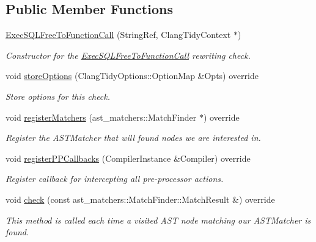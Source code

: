 \subsection*{Public Member Functions}
\begin{DoxyCompactItemize}
\item 
\hyperlink{classclang_1_1tidy_1_1pagesjaunes_1_1_exec_s_q_l_free_to_function_call_a389597efb3707e3478b53bdfdbb35a97}{Exec\+S\+Q\+L\+Free\+To\+Function\+Call} (String\+Ref, Clang\+Tidy\+Context $\ast$)
\begin{DoxyCompactList}\small\item\em Constructor for the \hyperlink{classclang_1_1tidy_1_1pagesjaunes_1_1_exec_s_q_l_free_to_function_call}{Exec\+S\+Q\+L\+Free\+To\+Function\+Call} rewriting check. \end{DoxyCompactList}\item 
void \hyperlink{classclang_1_1tidy_1_1pagesjaunes_1_1_exec_s_q_l_free_to_function_call_af83c40cd6384a2f9f2f9be2111addb93}{store\+Options} (Clang\+Tidy\+Options\+::\+Option\+Map \&Opts) override
\begin{DoxyCompactList}\small\item\em Store options for this check. \end{DoxyCompactList}\item 
void \hyperlink{classclang_1_1tidy_1_1pagesjaunes_1_1_exec_s_q_l_free_to_function_call_ac1311e6f8192bcea3c146493ff0130f3}{register\+Matchers} (ast\+\_\+matchers\+::\+Match\+Finder $\ast$) override
\begin{DoxyCompactList}\small\item\em Register the A\+S\+T\+Matcher that will found nodes we are interested in. \end{DoxyCompactList}\item 
void \hyperlink{classclang_1_1tidy_1_1pagesjaunes_1_1_exec_s_q_l_free_to_function_call_ac02e35d73287fc5b930c6122b2fcb1b4}{register\+P\+P\+Callbacks} (Compiler\+Instance \&Compiler) override
\begin{DoxyCompactList}\small\item\em Register callback for intercepting all pre-\/processor actions. \end{DoxyCompactList}\item 
void \hyperlink{classclang_1_1tidy_1_1pagesjaunes_1_1_exec_s_q_l_free_to_function_call_a98daafcadf9abd6eaec0eafc555b4c5a}{check} (const ast\+\_\+matchers\+::\+Match\+Finder\+::\+Match\+Result \&) override
\begin{DoxyCompactList}\small\item\em This method is called each time a visited A\+ST node matching our A\+S\+T\+Matcher is found. \end{DoxyCompactList}\end{DoxyCompactItemize}
